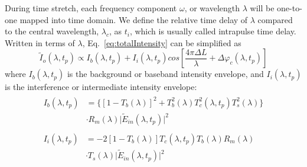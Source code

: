 \documentclass[aps,pra,reprint,longbibliography,superscriptaddress]{revtex4-1}
\begin{document}
During time stretch, each frequency component $\omega$, or wavelength $\lambda$ will be one-to-one mapped into time domain. We define the relative time delay of $\lambda$ compared to the central wavelength, $\lambda_c$, as $t_i$, which is usually called intrapulse time delay. Written in terms of $\lambda$, Eq.~\ref{eq:totalIntensity} can be simplified as
\begin{equation} \label{eq:totalIntensitylambda}
\tilde{I}_o(\lambda, t_p) \propto I_b (\lambda, t_p) + I_i (\lambda, t_p) cos[ \frac{4\pi\Delta L}{\lambda} + \Delta \varphi_c(\lambda, t_p) ]
\end{equation}
where $I_b (\lambda, t_p)$ is the background or baseband intensity envelope, and $I_i (\lambda, t_p)$ is the interference or intermediate intensity envelope:
\begin{align}
\begin{split} \label{eq:backgroundIntensity}
I_b (\lambda, t_p) &= \Big\lbrace [1-T_b(\lambda)]^2 + T_b^2(\lambda) T_c^2(\lambda, t_p) T_s^2(\lambda) \Big\rbrace \\
&\cdot R_m(\lambda) \lvert \tilde{E}_{in}(\lambda, t_p)\rvert^2
\end{split}\\
\begin{split} \label{eq:interferenceIntensity}
I_i (\lambda, t_p) &= - 2 [1-T_b(\lambda)] T_c(\lambda, t_p) T_b(\lambda) R_m(\lambda)\\
& \cdot T_s(\lambda) \lvert \tilde{E}_{in}(\lambda, t_p)\rvert^2
\end{split}
\end{align}
\end{document}
